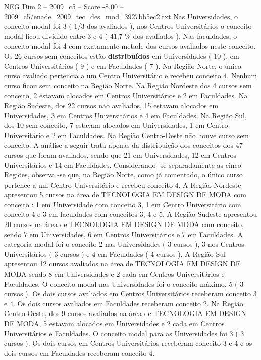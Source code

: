 \begin{textsample}{NEG Dim 2 – 2009\_c5 – Score -8.00 – 2009\_c5/enade\_2009\_tec\_des\_mod\_3927bb5ec2.txt}
Nas Universidades, o conceito modal foi 3 ( 1/3 dos avaliados ), nos Centros Universitários o conceito modal ficou dividido entre 3 e 4 ( 41,7 \% dos avaliados ).
Nas faculdades, o conceito modal foi 4 com exatamente metade dos cursos avaliados neste conceito.
Os 26 cursos sem conceitos estão \textbf{distribuídos} em Universidades ( 10 ), em Centros Universitários ( 9 ) e em Faculdades ( 7 ).
Na Região Norte, o único curso avaliado pertencia a um Centro Universitário e recebeu conceito 4.
Nenhum curso ficou sem conceito na Região Norte.
Na Região Nordeste dos 4 cursos sem conceito, 2 estavam alocados em Centros Universitários e 2 em Faculdades.
Na Região Sudeste, dos 22 cursos não avaliados, 15 estavam alocados em Universidades, 3 em Centros Universitários e 4 em Faculdades.
Na Região Sul, dos 10 sem conceito, 7 estavam alocados em Universidades, 1 em Centro Universitário e 2 em Faculdades.
Na Região Centro-Oeste não houve curso sem conceito.
A análise a seguir trata apenas da distribuição dos conceitos dos 47 cursos que foram avaliados, sendo que 21 em Universidades, 12 em Centros Universitários e 14 em Faculdades.
Considerando -se separadamente as cinco Regiões, observa -se que, na Região Norte, como já comentado, o único curso pertence a um Centro Universitário e recebeu conceito 4.
A Região Nordeste apresentou 5 cursos na área de TECNOLOGIA EM DESIGN DE MODA com conceito : 1 em Universidade com conceito 3, 1 em Centro Universitário com conceito 4 e 3 em faculdades com conceitos 3, 4 e 5.
A Região Sudeste apresentou 20 cursos na área de TECNOLOGIA EM DESIGN DE MODA com conceito, sendo 7 em Universidades, 6 em Centros Universitários e 7 em Faculdades.
A categoria modal foi o conceito 2 nas Universidades ( 3 cursos ), 3 nos Centros Universitários ( 3 cursos ) e 4 em Faculdades ( 4 cursos ).
A Região Sul apresentou 12 cursos avaliados na área de TECNOLOGIA EM DESIGN DE MODA sendo 8 em Universidades e 2 cada em Centros Universitários e Faculdades.
O conceito modal nas Universidades foi o conceito máximo, 5 ( 3 cursos ).
Os dois cursos avaliados em Centros Universitários receberam conceito 3 e 4.
Os dois cursos avaliados em Faculdades receberam conceito 2.
Na Região Centro-Oeste, dos 9 cursos avaliados na área de TECNOLOGIA EM DESIGN DE MODA, 5 estavam alocados em Universidades e 2 cada em Centros Universitários e Faculdades.
O conceito modal para as Universidades foi 3 ( 3 cursos ).
Os dois cursos em Centros Universitários receberam conceito 3 e 4 e os dois cursos em Faculdades receberam conceito 4.

\end{textsample}
